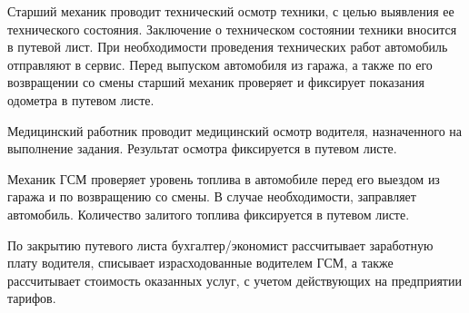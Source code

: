 \documentclass[../nirs.tex]{subfiles}
\begin{document}
Старший механик проводит технический осмотр техники, с целью выявления ее
технического состояния. Заключение о техническом состоянии техники
вносится в путевой лист. При необходимости проведения технических работ
автомобиль отправляют в сервис. Перед выпуском автомобиля из гаража, а также по
его возвращении со смены старший механик проверяет и фиксирует показания
одометра в путевом листе.

Медицинский работник проводит медицинский осмотр водителя, назначенного на
выполнение задания. Результат осмотра фиксируется в путевом листе.

Механик ГСМ проверяет уровень топлива в автомобиле перед его выездом из гаража и
по возвращению со смены. В случае необходимости, заправляет автомобиль.
Количество залитого топлива фиксируется в путевом листе.

По закрытию путевого листа бухгалтер/экономист рассчитывает заработную плату
водителя, списывает израсходованные водителем ГСМ, а также рассчитывает
стоимость оказанных услуг, с учетом действующих на предприятии тарифов.
\end{document}
